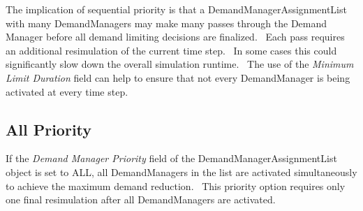 The implication of sequential priority is that a DemandManagerAssignmentList with many DemandManagers may make many passes through the Demand Manager before all demand limiting decisions are finalized.~ Each pass requires an additional resimulation of the current time step.~ In some cases this could significantly slow down the overall simulation runtime.~ The use of the \emph{Minimum Limit Duration} field can help to ensure that not every DemandManager is being activated at every time step.

\subsection{All Priority}\label{all-priority}

If the \emph{Demand Manager Priority} field of the DemandManagerAssignmentList object is set to ALL, all DemandManagers in the list are activated simultaneously to achieve the maximum demand reduction.~ This priority option requires only one final resimulation after all DemandManagers are activated.
